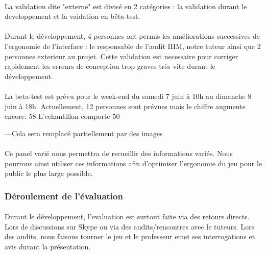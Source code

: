\documentclass[11pt]{article} %
\begin{document}
\paragraph{}
La validation dite "externe" est divisé en 2 catégories : la validation durant le developpement et la vaidation en bêta-test. 
\paragraph{}
Durant le développement, 4 personnes ont permis les améliorations successives de l'ergonomie de l'interface : le responsable de l'audit IHM, notre tuteur ainsi que 2 personnes exterieur au projet. Cette validation est necessaire pour corriger rapidement les erreurs de conception trop graves très vite durant le développement.
\paragraph{}
La beta-test est prévu pour le week-end du samedi 7 juin à 10h au dimanche 8 juin à 18h. Actuellement, 12 personnes sont prévues mais le chiffre augmente encore.
58%
L'echantillon comporte 50%

---Cela sera remplacé partiellement par des images

\paragraph{}
Ce panel varié nous permettra de recueillir des informations variés. Nous pourrons ainsi utiliser ces informations afin d'optimiser l'ergonomie du jeu pour le public le plus large possible.

\subsubsection{Déroulement de l'évaluation}
\paragraph{}
Durant le développement, l'evaluation est surtout faite via des retours directs. Lors de discussions sur Skype ou via des audits/rencontres avec le tuteurs. Lors des audits, nous faisons tourner le jeu et le professeur emet ses interrogations et avis durant la présentation. 
\end{document}
